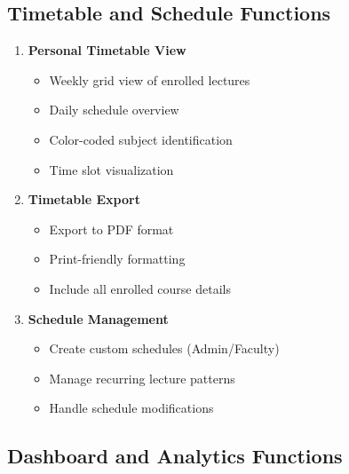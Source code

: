 \subsection{Timetable and Schedule Functions}

\begin{enumerate}[leftmargin=*]
    \item \textbf{Personal Timetable View}
    \begin{itemize}
        \item Weekly grid view of enrolled lectures
        \item Daily schedule overview
        \item Color-coded subject identification
        \item Time slot visualization
    \end{itemize}
    
    \item \textbf{Timetable Export}
    \begin{itemize}
        \item Export to PDF format
        \item Print-friendly formatting
        \item Include all enrolled course details
    \end{itemize}
    
    \item \textbf{Schedule Management}
    \begin{itemize}
        \item Create custom schedules (Admin/Faculty)
        \item Manage recurring lecture patterns
        \item Handle schedule modifications
    \end{itemize}
\end{enumerate}

\subsection{Dashboard and Analytics Functions}

